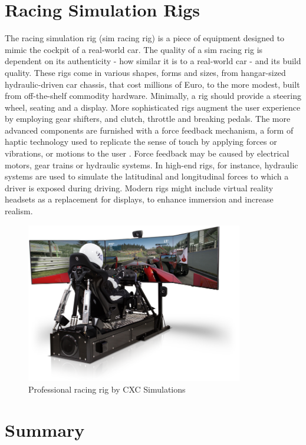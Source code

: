 \section{Racing Simulation Rigs}
The racing simulation rig (sim racing rig) is a piece of equipment designed to mimic the cockpit of a real-world car. The quality of a sim racing rig is dependent on its authenticity - how similar it is to a real-world car - and its build quality. These rigs come in various shapes, forms and sizes, from hangar-sized hydraulic-driven car chassis, that cost millions of Euro, to the more modest, built from off-the-shelf commodity hardware. Minimally, a rig should provide a steering wheel, seating and a display. More sophisticated rigs augment the user experience by employing gear shifters, and clutch, throttle and breaking pedals. The more advanced components are furnished with a force feedback mechanism, a form of haptic technology used to replicate the sense of touch by applying forces or vibrations, or motions to the user \cite{li2015can}. Force feedback may be caused by electrical motors, gear trains or hydraulic systems. In high-end rigs, for instance, hydraulic systems are used to simulate the latitudinal and longitudinal forces to which a driver is exposed during driving. Modern rigs might include virtual reality headsets as a replacement for displays, to enhance immersion and increase realism.

\begin{figure}[!htb]
	\centering
	\includegraphics[height=7cm]{images/rig2.png}
	\caption{Professional racing rig by CXC Simulations}
	\label{fig:proracingrig}
\end{figure}

\section{Summary}






